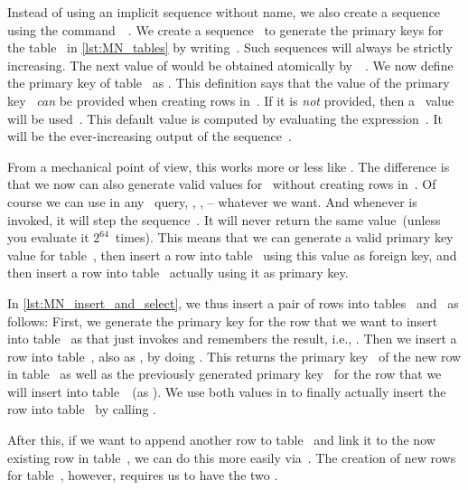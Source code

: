 Instead of using an implicit sequence without name, we also create a sequence using the command~~\cite{PGDG:PD:CS}.
We create a sequence~ to generate the primary keys for the table~ in \cref{lst:MN_tables} by writing~.
Such sequences will always be strictly increasing.
The next value of  would be obtained atomically by~~\cite{PGDG:PD:SMF}.
We now define the primary key of table~ as .
This definition says that the value of the primary key~ \emph{can} be provided when creating rows in~.
If it is \emph{not} provided, then a~ value will be used~\cite{PGDG:PD:DV2}.
This default value is computed by evaluating the expression~.
It will be the ever-increasing output of the sequence~.%
%
\begin{sloppypar}%
From a mechanical point of view, this works more or less like \linebreak[3].
The difference is that we now can also generate valid values for~ without creating rows in~.
Of course we can use  in any \sql\ query, , ,  -- whatever we want.
And whenever  is invoked, it will step the sequence~.
It will never return the same value~(unless you evaluate it $2^{64}$~times).
This means that we can generate a valid primary key value for table~, then insert a row into table~ using this value as foreign key, and then insert a row into table~ actually using it as primary key.%
\end{sloppypar}%
%
\begin{sloppypar}%
In \cref{lst:MN_insert_and_select}, we thus insert a pair of rows into tables~ and~ as follows:
First, we generate the primary key for the row that we want to insert into table~ as  that just invokes  and remembers the result, i.e., .
Then we insert a row into table~, also as , by doing .
This  returns the primary key~ of the new row in table~ as well as the previously generated primary key~ for the row that we will insert into table~~(as ).
We use both values in to finally actually insert the row into table~ by calling .%
\end{sloppypar}%
%
After this, if we want to append  another row to table~ and link it to the now existing row in table~, we can do this more easily via~.
The creation of new rows for table~, however, requires us to have the two .

